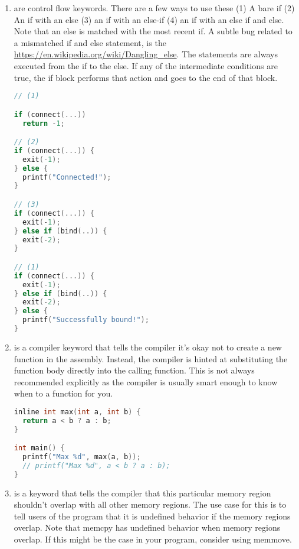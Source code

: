 \begin{enumerate}
	    \item {} are control flow keywords.
        There are a few ways to use these (1) A bare if (2) An if with an else (3) an if with an else-if (4) an if with an else if and else.
        Note that an else is matched with the most recent if.
        A subtle bug related to a mismatched if and else statement, is the \href{dangling else problem}{https://en.wikipedia.org/wiki/Dangling\_else}.
        The statements are always executed from the if to the else.
        If any of the intermediate conditions are true, the if block performs that action and goes to the end of that block.

	      \begin{lstlisting}[language=C]
// (1)

if (connect(...))
  return -1;

// (2)
if (connect(...)) {
  exit(-1);
} else {
  printf("Connected!");
}

// (3)
if (connect(...)) {
  exit(-1);
} else if (bind(..)) {
  exit(-2);
}

// (1)
if (connect(...)) {
  exit(-1);
} else if (bind(..)) {
  exit(-2);
} else {
  printf("Successfully bound!");
}
\end{lstlisting}

	    \item {} is a compiler keyword that tells the compiler it's okay not to create a new function in the assembly.
        Instead, the compiler is hinted at substituting the function body directly into the calling function.
        This is not always recommended explicitly as the compiler is usually smart enough to know when to  a function for you.

	      \begin{lstlisting}[language=C]
inline int max(int a, int b) {
  return a < b ? a : b;
}

int main() {
  printf("Max %d", max(a, b));
  // printf("Max %d", a < b ? a : b);
}
\end{lstlisting}

	    \item {} is a keyword that tells the compiler that this particular memory region shouldn't overlap with all other memory regions.
        The use case for this is to tell users of the program that it is undefined behavior if the memory regions overlap.
        Note that memcpy has undefined behavior when memory regions overlap.
        If this might be the case in your program, consider using memmove.


\end{enumerate}
